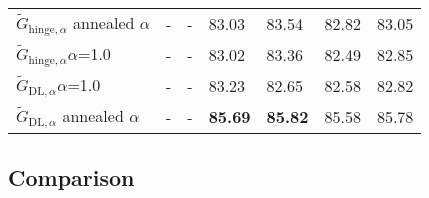 \documentclass[letterpaper]{article} \usepackage{aaai18}  \usepackage{times}  \usepackage{helvet}  \usepackage{courier}  \usepackage{url}  \usepackage{graphicx}  \frenchspacing
\begin{document}
\begin{table*}[t]
{\begin{tabular}{lllllll}
$\tilde{G}_{\textrm{hinge},\alpha}$ annealed $\alpha$   & -        & -       & 83.03        & 83.54      &    82.82     & 83.05\\        
$\tilde{G}_{\textrm{hinge},\alpha} \alpha$=1.0 & -        & -       & 83.02        & 83.36      &    82.49     & 82.85\\       
$\tilde{G}_{\textrm{DL},\alpha} \alpha$=1.0 & -        & -       & 83.23        & 82.65      &    82.58     & 82.82\\  
$\tilde{G}_{\textrm{DL},\alpha}$ annealed $\alpha$   & -        & -       & \bf 85.69        & \bf 85.82     &    85.58     & 85.78\\  
\bottomrule
\end{tabular}
}
\end{table*} \hspace{-0.2cm}\begin{table*}[t]\centering
\caption{Results on Named Entity Recognition. Macro F1 over the prediction of different named entities is reported that is a standard evaluation metric for this task.}
\label{NER}
\end{table*} \subsection{Comparison}
\end{document}
